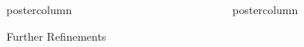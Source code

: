 \documentclass[final,hyperref={pdfpagelabels=false}]{beamer}
\newlength{\columnheight}
\begin{document}
\begin{frame}
\begin{columns}
\begin{column}{.33\textwidth}
\begin{beamercolorbox}[center,wd=\textwidth]{postercolumn}
\begin{minipage}[T]{.95\textwidth}
{\begin{block}{Further Refinements}
\begin{columns}
\begin{column}{.99\textwidth}
                \end{column}
              \end{columns}
            \end{block}
          }
        \end{minipage}
      \end{beamercolorbox}
    \end{column}

    \begin{column}{.33\textwidth}
      \begin{beamercolorbox}[center,wd=\textwidth]{postercolumn}
        \begin{minipage}[T]{.95\textwidth} %
          \parbox[t][\columnheight]{\textwidth}{ %

}
\end{minipage}
\end{beamercolorbox}
\end{column}
\end{columns}
\end{frame}
\end{document}

